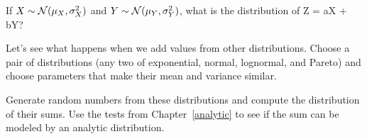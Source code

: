 \documentclass[12pt]{book}
\begin{document}
\begin{exercise}
If 
$X \sim \mathcal{N} (\mu_{X}, \sigma_{X}^{2})$ and
$Y \sim \mathcal{N} (\mu_{Y}, \sigma_{Y}^{2})$, what 
is the distribution of Z = aX + bY?

\end{exercise}

\begin{exercise}
Let's see what happens when we add values from
other distributions.  Choose a pair of distributions (any two of
exponential, normal, lognormal, and Pareto) and choose parameters
that make their mean and variance similar.

Generate random numbers from these distributions and compute the
distribution of their sums.  Use the tests from
Chapter~\ref{analytic} to see if the sum can be modeled by an
analytic distribution.

\end{exercise}



\printindex

\clearemptydoublepage
\end{document}
